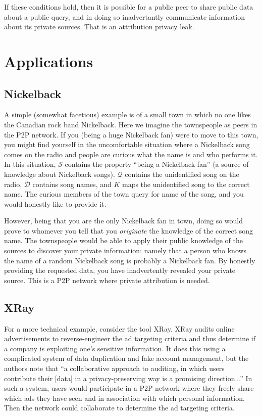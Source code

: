 \documentclass{article}
\begin{document}
If these conditions hold, then it is possible for a public peer to share public
data about a public query, and in doing so inadvertantly communicate information
about its private sources. That is an attribution privacy leak.

\section{Applications}
\label{example}

\subsection{Nickelback}

A simple (somewhat facetious) example is of a small town in which no one likes
the Canadian rock band Nickelback. Here we imagine the townspeople as peers in
the P2P network. If you (being a huge Nickelback fan) were to move to this town,
you might find yourself in the uncomfortable situation where a Nickelback song
comes on the radio and people are curious what the name is and who performs it.
In this situation, $\mathcal{S}$ contains the property ``being a Nickelback
fan'' (a source of knowledge about Nickelback songs). $\mathcal{Q}$ contains the
unidentified song on the radio, $\mathcal{D}$ contains song names, and $K$ maps
the unidentified song to the correct name. The curious members of the town query
for name of the song, and you would honestly like to provide it.

However, being that you are the only Nickelback fan in town, doing so would
prove to whomever you tell that you {\it originate} the knowledge of the correct
song name. The townspeople would be able to apply their public knowledge of the
sources to discover your private information: namely that a person who knows the
name of a random Nickelback song is probably a Nickelback fan. By honestly
providing the requested data, you have inadvertently revealed your private
source. This is a P2P network where private attribution is needed.

\subsection{XRay}

For a more technical example, consider the tool XRay\cite{xray}. XRay audits
online advertisements to reverse-engineer the ad targeting criteria and thus
determine if a company is exploiting one's sensitive information. It does this
using a complicated system of data duplication and fake account management, but
the authors note that ``a collaborative approach to auditing, in which users
contribute their [data] in a privacy-preserving way is a promising
direction...'' In such a system, users would participate in a P2P network where
they freely share which ads they have seen and in association with which
personal information. Then the network could collaborate to determine the ad
targeting criteria.
\end{document}
